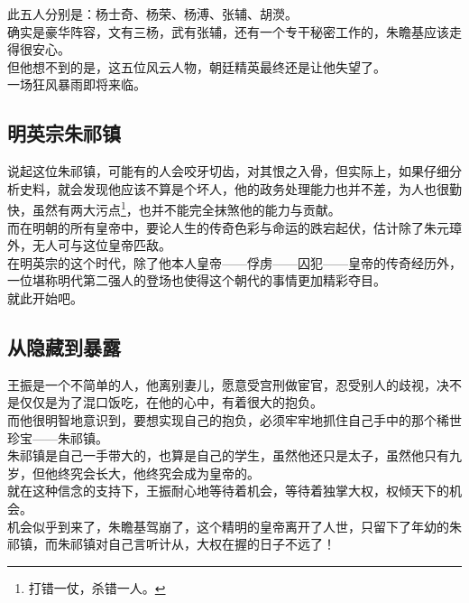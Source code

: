\begin{multicols}{\theparacolNo}
此五人分别是：杨士奇、杨荣、杨溥、张辅、胡濙。\\

确实是豪华阵容，文有三杨，武有张辅，还有一个专干秘密工作的，朱瞻基应该走得很安心。\\

但他想不到的是，这五位风云人物，朝廷精英最终还是让他失望了。\\

一场狂风暴雨即将来临。\\

\subsection{明英宗朱祁镇}
说起这位朱祁镇，可能有的人会咬牙切齿，对其恨之入骨，但实际上，如果仔细分析史料，就会发现他应该不算是个坏人，他的政务处理能力也并不差，为人也很勤快，虽然有两大污点\footnote{打错一仗，杀错一人。}，也并不能完全抹煞他的能力与贡献。\\

而在明朝的所有皇帝中，要论人生的传奇色彩与命运的跌宕起伏，估计除了朱元璋外，无人可与这位皇帝匹敌。\\

在明英宗的这个时代，除了他本人皇帝——俘虏——囚犯——皇帝的传奇经历外，一位堪称明代第二强人的登场也使得这个朝代的事情更加精彩夺目。\\

就此开始吧。\\

\subsection{从隐藏到暴露}
王振是一个不简单的人，他离别妻儿，愿意受宫刑做宦官，忍受别人的歧视，决不是仅仅是为了混口饭吃，在他的心中，有着很大的抱负。\\

而他很明智地意识到，要想实现自己的抱负，必须牢牢地抓住自己手中的那个稀世珍宝——朱祁镇。\\

朱祁镇是自己一手带大的，也算是自己的学生，虽然他还只是太子，虽然他只有九岁，但他终究会长大，他终究会成为皇帝的。\\

就在这种信念的支持下，王振耐心地等待着机会，等待着独掌大权，权倾天下的机会。\\

机会似乎到来了，朱瞻基驾崩了，这个精明的皇帝离开了人世，只留下了年幼的朱祁镇，而朱祁镇对自己言听计从，大权在握的日子不远了！\\


\end{multicols}
